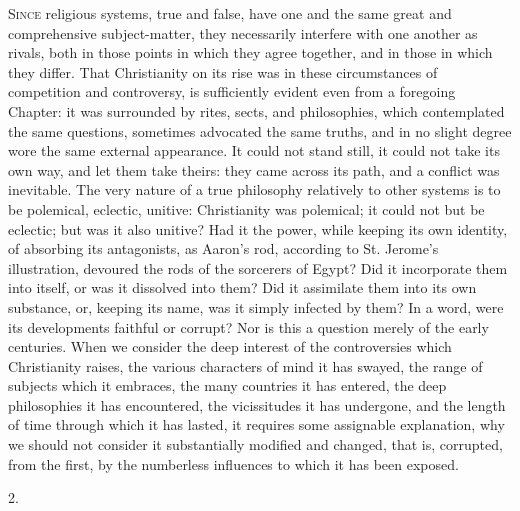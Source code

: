 
S\textsc{ince} religious systems, true and false, have
one and the same great and comprehensive subject-matter,
they necessarily interfere with one another as rivals,
both in those points in which they agree together, and in
those in which they differ. That Christianity on its rise
was in these circumstances of competition and
controversy, is sufficiently evident even from a
foregoing Chapter: it was surrounded by rites, sects, and
philosophies, which contemplated the same questions,
sometimes advocated the same truths, and in no slight
degree wore the same external appearance. It could not
stand still, it could not take its own way, and let them
take theirs: they came across its path, and a conflict
was inevitable. The very nature of a true philosophy
relatively to other systems is to be polemical, eclectic,
unitive: Christianity was polemical; it could not but be
eclectic; but was it also unitive? Had it the power,
while keeping its own identity, of absorbing its
antagonists, as Aaron's rod, according to St. Jerome's
illustration, devoured the rods of the sorcerers of
Egypt? Did it incorporate them into itself, or was it
dissolved into them? Did it assimilate them into its own
substance, or, keeping its name, was it simply
infected by them? In a word, were its developments
faithful or corrupt? Nor is this a question merely of the
early centuries. When we consider the deep interest of
the controversies which Christianity raises, the various
characters of mind it has swayed, the range of subjects
which it embraces, the many countries it has entered, the
deep philosophies it has encountered, the vicissitudes it
has undergone, and the length of time through which it
has lasted, it requires some assignable explanation, why
we should not consider it substantially modified and
changed, that is, corrupted, from the first, by the
numberless influences to which it has been exposed.

2.

